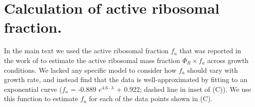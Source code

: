 \section{Calculation of active ribosomal fraction.}

In the main text we used the active ribosomal fraction $f_a$ that was reported
in the work of \cite{dai2016} to estimate the active ribosomal mass fraction
$\Phi_R \times f_a$ across growth conditions. We lacked any specific model to
consider how  $f_a$ should vary with growth rate, and instead find that the data
is well-approximated by fitting to an exponential curve ($f_a$ = -0.889 $e^{4.6
\cdot \lambda}$ + 0.922; dashed line in inset of (C)). We
use this function to estimate $f_a$ for each of the data points shown in
(C).



%
%
%
%
%
%


